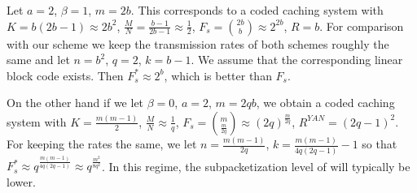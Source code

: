 \documentclass[journal,twocolumn]{IEEEtran}
\theoremstyle{definition}
\newtheorem{example}{Example}
\begin{document}
Let $a=2$, $\beta=1$, $m=2b$. This corresponds to a coded caching system with $K=b(2b-1)\approx 2b^2$, $\frac{M}{N}=\frac{b-1}{2b-1}\approx \frac{1}{2}$, $F_s=\binom{2b}{b}\approx 2^{2b}$, $R=b$. For comparison with our scheme we keep the transmission rates of both schemes roughly the same and let $n=b^2$, $q=2$, $k=b-1$. We assume that the corresponding linear block code exists. Then $F^*_s\approx 2^b$, which is better than $F_s$.

On the other hand if we let $\beta=0$, $a=2$, $m=2qb$, we obtain a coded caching system with
$K=\frac{m(m-1)}{2}$, $\frac{M}{N}\approx \frac{1}{q}$, $F_s=\binom{m}{\frac{m}{2q}}\approx (2q)^{\frac{m}{2q}}$, $R^{YAN}=(2q-1)^2$.
For keeping the rates the same, we let $n=\frac{m(m-1)}{2q}$, $k= \frac{m(m-1)}{4q(2q-1)}-1$ so that  $F^*_s\approx q^{\frac{m(m-1)}{4q(2q-1)}}\approx q^{\frac{m^2}{8q^2}}$. In this regime, the subpacketization level of \cite{yan2016placement} will typically be lower.


%
\end{document}

